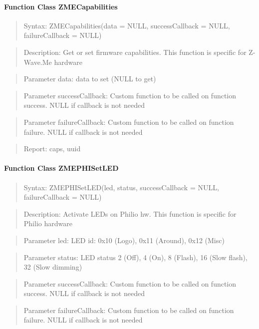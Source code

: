 \paragraph{Function Class ZMECapabilities}
\begin{quote}Syntax: ZMECapabilities(data = NULL, successCallback = NULL, failureCallback = NULL)\end{quote}
\begin{quote}Description: Get or set firmware capabilities. This function is specific for Z-Wave.Me hardware\end{quote}
\begin{quote}Parameter data: data to set (NULL to get)\end{quote}
\begin{quote}Parameter successCallback: Custom function to be called on function success. NULL if callback is not needed\end{quote}
\begin{quote}Parameter failureCallback: Custom function to be called on function failure. NULL if callback is not needed\end{quote}
\begin{quote}Report: caps, uuid\end{quote}

\paragraph{Function Class ZMEPHISetLED}
\begin{quote}Syntax: ZMEPHISetLED(led, status, successCallback = NULL, failureCallback = NULL)\end{quote}
\begin{quote}Description: Activate LEDs on Philio hw. This function is specific for Philio hardware\end{quote}
\begin{quote}Parameter led: LED id: 0x10 (Logo), 0x11 (Around), 0x12 (Misc)\end{quote}
\begin{quote}Parameter status: LED status 2 (Off), 4 (On), 8 (Flash), 16 (Slow flash), 32 (Slow dimming)\end{quote}
\begin{quote}Parameter successCallback: Custom function to be called on function success. NULL if callback is not needed\end{quote}
\begin{quote}Parameter failureCallback: Custom function to be called on function failure. NULL if callback is not needed\end{quote}


